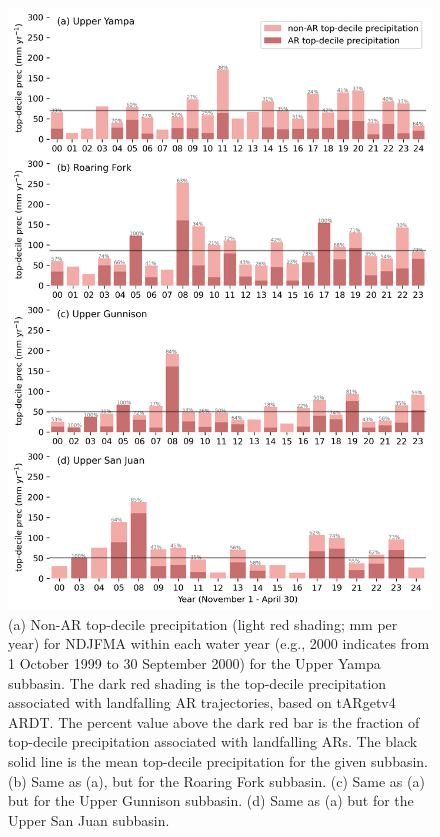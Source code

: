 \documentclass[draft]{agujournal2019}
\begin{document}
\begin{figure}
\noindent\includegraphics[width=\textwidth, height=\textheight, keepaspectratio]{fig7.png}

\caption{(a) Non-AR top-decile precipitation (light red shading; mm per year) for NDJFMA within each water year (e.g., 2000 indicates from 1 October 1999 to 30 September 2000) for the Upper Yampa subbasin. The dark red shading is the top-decile precipitation associated with landfalling AR trajectories, based on tARgetv4 ARDT. The percent value above the dark red bar is the fraction of top-decile precipitation associated with landfalling ARs. The black solid line is the mean top-decile precipitation for the given subbasin. (b) Same as (a), but for the Roaring Fork subbasin. (c) Same as (a) but for the Upper Gunnison subbasin. (d) Same as (a) but for the Upper San Juan subbasin.}
\label{fig:time_series}
\end{figure}
\end{document}
